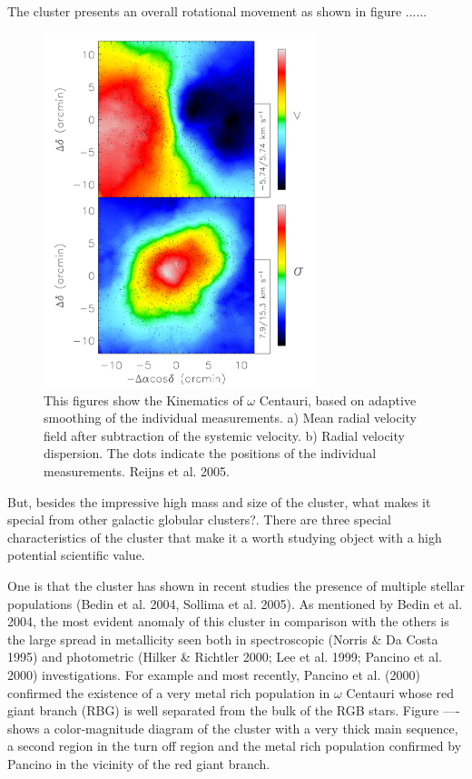 The cluster presents an overall rotational movement as shown in figure ......

\begin{figure}[H]
\centering
\includegraphics[width=8cm]{images/rotation_omega.png}
\caption[Ever]{This figures show the Kinematics of $\omega$ Centauri, based on adaptive smoothing of the individual measurements. a) Mean radial velocity field after subtraction of the systemic velocity. b) Radial velocity dispersion. The dots indicate the positions of the individual measurements. Reijns et al. 2005.
}
\end{figure}

But, besides the impressive high mass and size of the cluster, what makes it special from other galactic globular clusters?. There are three special characteristics of the cluster that make it a worth studying object with a high potential scientific value.

One is that the cluster has shown in recent studies the presence of multiple stellar populations (Bedin et al. 2004, Sollima et al. 2005). As mentioned by Bedin et al. 2004, the most evident anomaly of this cluster in comparison with the others is the large spread in metallicity seen both in spectroscopic (Norris \& Da Costa 1995) and photometric (Hilker \& Richtler 2000; Lee et al. 1999; Pancino et al. 2000) investigations. For example and most recently, Pancino et al. (2000) confirmed the existence of a very metal rich population in $\omega$ Centauri whose red giant branch (RBG) is well separated from the bulk of the RGB stars. Figure ---- shows a color-magnitude diagram of the cluster with a very thick main sequence, a second region in the turn off region and the metal rich population confirmed by Pancino in the vicinity of the red giant branch.

